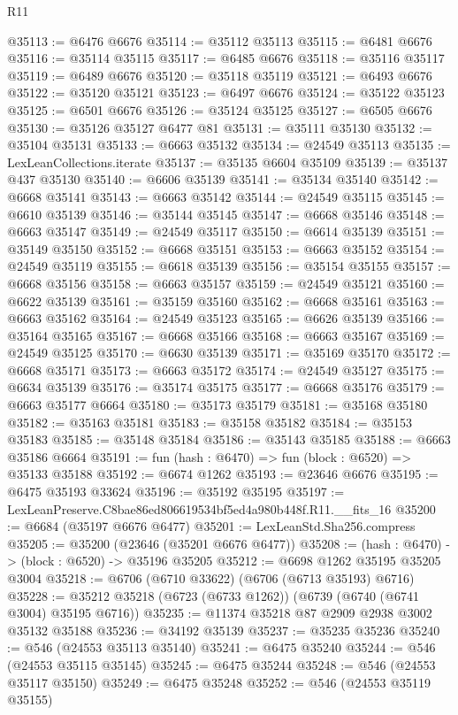 \begin{lexlean}{R11}
\begin{coremodule}
@35113 := @6476 @6676
@35114 := @35112 @35113
@35115 := @6481 @6676
@35116 := @35114 @35115
@35117 := @6485 @6676
@35118 := @35116 @35117
@35119 := @6489 @6676
@35120 := @35118 @35119
@35121 := @6493 @6676
@35122 := @35120 @35121
@35123 := @6497 @6676
@35124 := @35122 @35123
@35125 := @6501 @6676
@35126 := @35124 @35125
@35127 := @6505 @6676
@35130 := @35126 @35127 @6477 @81
@35131 := @35111 @35130
@35132 := @35104 @35131
@35133 := @6663 @35132
@35134 := @24549 @35113
@35135 := LexLeanCollections.iterate
@35137 := @35135 @6604 @35109
@35139 := @35137 @437 @35130
@35140 := @6606 @35139
@35141 := @35134 @35140
@35142 := @6668 @35141
@35143 := @6663 @35142
@35144 := @24549 @35115
@35145 := @6610 @35139
@35146 := @35144 @35145
@35147 := @6668 @35146
@35148 := @6663 @35147
@35149 := @24549 @35117
@35150 := @6614 @35139
@35151 := @35149 @35150
@35152 := @6668 @35151
@35153 := @6663 @35152
@35154 := @24549 @35119
@35155 := @6618 @35139
@35156 := @35154 @35155
@35157 := @6668 @35156
@35158 := @6663 @35157
@35159 := @24549 @35121
@35160 := @6622 @35139
@35161 := @35159 @35160
@35162 := @6668 @35161
@35163 := @6663 @35162
@35164 := @24549 @35123
@35165 := @6626 @35139
@35166 := @35164 @35165
@35167 := @6668 @35166
@35168 := @6663 @35167
@35169 := @24549 @35125
@35170 := @6630 @35139
@35171 := @35169 @35170
@35172 := @6668 @35171
@35173 := @6663 @35172
@35174 := @24549 @35127
@35175 := @6634 @35139
@35176 := @35174 @35175
@35177 := @6668 @35176
@35179 := @6663 @35177 @6664
@35180 := @35173 @35179
@35181 := @35168 @35180
@35182 := @35163 @35181
@35183 := @35158 @35182
@35184 := @35153 @35183
@35185 := @35148 @35184
@35186 := @35143 @35185
@35188 := @6663 @35186 @6664
@35191 := fun (hash : @6470) => fun (block : @6520) => @35133 @35188
@35192 := @6674 @1262
@35193 := @23646 @6676
@35195 := @6475 @35193 @33624
@35196 := @35192 @35195
@35197 := LexLeanPreserve.C8bae86ed806619534bf5ed4a980b448f.R11.__fits_16
@35200 := @6684 (@35197 @6676 @6477)
@35201 := LexLeanStd.Sha256.compress
@35205 := @35200 (@23646 (@35201 @6676 @6477))
@35208 := (hash : @6470) -> (block : @6520) -> @35196 @35205
@35212 := @6698 @1262 @35195 @35205 @3004
@35218 := @6706 (@6710 @33622) (@6706 (@6713 @35193) @6716)
@35228 := @35212 @35218 (@6723 (@6733 @1262)) (@6739 (@6740 (@6741 @3004) @35195 @6716))
@35235 := @11374 @35218 @87 @2909 @2938 @3002 @35132 @35188
@35236 := @34192 @35139
@35237 := @35235 @35236
@35240 := @546 (@24553 @35113 @35140)
@35241 := @6475 @35240
@35244 := @546 (@24553 @35115 @35145)
@35245 := @6475 @35244
@35248 := @546 (@24553 @35117 @35150)
@35249 := @6475 @35248
@35252 := @546 (@24553 @35119 @35155)

\end{coremodule}
\end{lexlean}
